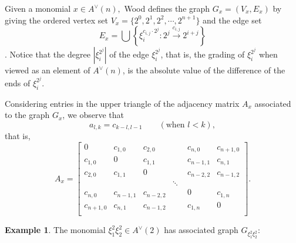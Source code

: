 \documentclass{amsart}
\theoremstyle{definition}
\newtheorem{example}[theorem]{Example}
\theoremstyle{plain}
\numberwithin{theorem}{section}
\numberwithin{equation}{section}
\numberwithin{figure}{section}
\newcommand{\0}{\langle 0 \rangle }
\begin{document}
Given a monomial \color{black} $x \in A^\vee(n),$ Wood defines the graph $G_x = (V_x, E_x)$ by giving the ordered vertex set $V_x = \{2^0, 2^1, 2^2, \cdots, 2^{n + 1} \}$ and the edge set 
\[
E_x = \bigcup \left\{ \xi_i^{c_{i,j} \cdot 2^j} : 2^{j } \xrightarrow{c_{i,j}} 2^{i + j}  \right\}
\]
\cite[]{Wood98}. 
Notice that  the degree $|\xi_i^{2^j}|$ of the edge $\xi_i^{2^j}$, that is, the grading of $\xi_i^{2^j}$ when viewed as an element of $A^\vee(n)$, is \color{black}the absolute value of the difference of the ends of $\xi_i^{2^j}$.

Considering entries in the upper triangle of the adjacency matrix $A_{x}$ associated to the graph $G_x$, we observe that 
\begin{equation} \label{eq:acRel}
    a_{l,k} = c_{k-l,l-1} \qquad (\text{when } l < k),
\end{equation}
that is,
\begin{equation} \label{eq:AdjMp=2}
A_{x} = \begin{bmatrix}
    0 & c_{1,0} & c_{2,0} & \quad & c_{n,0} & c_{n + 1, 0} \\
    c_{1,0} & 0 & c_{1,1} & \quad & c_{n-1,1} & c_{n, 1} \\
    c_{2,0} &  c_{1,1} & 0 & \quad & c_{n-2,2} & c_{n -1, 2} \\
    & & & \ddots & & \\
    c_{n,0} & c_{n-1,1} & c_{n-2,2} & & 0 & c_{1, n} \\
    c_{n + 1, 0} & c_{n, 1} & c_{n-1,2} & & c_{1, n} & 0 \\
\end{bmatrix}.
\end{equation}

\begin{example}
The monomial $\xi_1^2 \xi_2^2 \in A^\vee(2)$ has associated graph $G_{\xi_1^2 \xi_2^2}$:
    \vspace{1em}
        \begin{center}
    \end{center}
\end{example}
\end{document}
